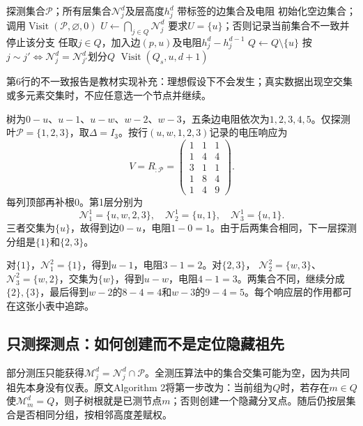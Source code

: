 \begin{algorithm}[htbp]
\caption{S12全测压递归：原文Algorithm 1的统一记号重述}
\label{alg:tb-S12-full}
\begin{algorithmic}[1]
\Require 探测集合$\mathcal P$；所有层集合$\mathcal N_j^d$及层高度$h_j^d$
\Ensure 带标签的边集合及电阻
\State 初始化空边集合；调用$\operatorname{Visit}(\mathcal P,\varnothing,0)$
 \State $U\gets\bigcap_{j\in Q}\mathcal N_j^d$
 \State 要求$U=\{u\}$；否则记录当前集合不一致并停止该分支
  \State 任取$j\in Q$，加入边$(p,u)$及电阻$h_j^d-h_j^{d-1}$
 \EndIf
 \State $Q\gets Q\setminus\{u\}$
 \State 按$j\sim j'\Longleftrightarrow\mathcal N_j^d=\mathcal N_{j'}^d$划分$Q$
  \State $\operatorname{Visit}(Q_s,u,d+1)$
 \EndFor
\EndFunction
\end{algorithmic}
\end{algorithm}
第6行的不一致报告是教材实现补充：理想假设下不会发生；真实数据出现空交集或多元素交集时，不应任意选一个节点并继续。

\begin{example}
树为$0\!-\!u$、$u\!-\!1$、$u\!-\!w$、$w\!-\!2$、$w\!-\!3$，五条边电阻依次为$1,2,3,4,5$。仅探测叶$\mathcal P=\{1,2,3\}$，取$\Delta=I_3$。按行$(u,w,1,2,3)$记录的电压响应为
\[
 V=R_{:\mathcal P}=
 \begin{pmatrix}
 1&1&1\\1&4&4\\3&1&1\\1&8&4\\1&4&9
 \end{pmatrix}.
\]
每列顶部再补根0。第1层分别为
\[
 \mathcal N_1^1=\{u,w,2,3\},\quad
 \mathcal N_2^1=\{u,1\},\quad
 \mathcal N_3^1=\{u,1\}.
\]
三者交集为$\{u\}$，故得到边$0-u$，电阻$1-0=1$。由于后两集合相同，下一层探测分组是$\{1\}$和$\{2,3\}$。

对$\{1\}$，$\mathcal N_1^2=\{1\}$，得到$u-1$，电阻$3-1=2$。对$\{2,3\}$，
$\mathcal N_2^2=\{w,3\}$、$\mathcal N_3^2=\{w,2\}$，交集为$\{w\}$，得到$u-w$，电阻$4-1=3$。两集合不同，继续分成$\{2\},\{3\}$，最后得到$w-2$的$8-4=4$和$w-3$的$9-4=5$。每个响应层的作用都可在这张小表中追踪。
\end{example}

\subsection{只测探测点：如何创建而不是定位隐藏祖先}

部分测压只能获得$\mathcal M_j^d=\mathcal N_j^d\cap\mathcal P$。全测压算法中的集合交集可能为空，因为共同祖先本身没有仪表。原文Algorithm 2将第一步改为：当前组为$Q$时，若存在$m\in Q$使$\mathcal M_m^d=Q$，则子树根就是已测节点$m$；否则创建一个隐藏分叉点。随后仍按层集合是否相同分组，按相邻高度差赋权。

